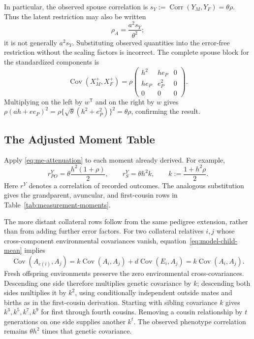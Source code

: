 In particular, the observed spouse correlation is
$s_Y:=\operatorname{Corr}(Y_M,Y_F)=\theta\rho$. Thus the latent
restriction may also be written
\[
 \rho_A=\frac{a^2s_Y}{\theta^2};
\]
it is not generally $a^2s_Y$. Substituting observed quantities into the
error-free restriction without the scaling factors is incorrect.
The complete spouse block for the standardized components is
\[
 \operatorname{Cov}(X_M^+,X_F^+)
 =\rho\begin{pmatrix}
 h^2&he_P&0\\he_P&e_P^2&0\\0&0&0
 \end{pmatrix}.
\]
Multiplying on the left by $w^{\mathsf T}$ and on the right by $w$
gives $\rho(ah+ee_P)^2
=\rho\{\sqrt{\theta}(h^2+e_P^2)\}^2=\theta\rho$, confirming the result.

\subsection{The Adjusted Moment Table}
\label{sec:me-table}

Apply \eqref{eq:me-attenuation} to each moment already derived. For
example,
\[
 r_{PO}^{Y}=\theta\frac{h^2(1+\rho)}{2},\qquad
 r_S^{Y}=\theta h^2k,\qquad
 k:=\frac{1+h^2\rho}{2}.
\]
Here $r^Y$ denotes a correlation of recorded outcomes. The analogous
substitution gives the grandparent, avuncular, and first-cousin rows
in Table~\ref{tab:measurement-moments}.

The more distant collateral rows follow from the same pedigree
extension, rather than from adding further error factors.
For two collateral relatives $i,j$ whose cross-component environmental
covariances vanish, equation~\eqref{eq:model-child-mean} implies
\[
 \operatorname{Cov}(A_{c(i)},A_j)
 =k\operatorname{Cov}(A_i,A_j)+d\operatorname{Cov}(E_i,A_j)
 =k\operatorname{Cov}(A_i,A_j).
\]
Fresh offspring environments preserve the zero environmental
cross-covariances. Descending one side therefore multiplies genetic
covariance by $k$; descending both sides multiplies it by $k^2$,
using conditionally independent outside mates and births as in the
first-cousin derivation. Starting with sibling covariance $k$ gives
$k^3,k^5,k^7,k^9$ for first through fourth cousins. Removing a cousin
relationship by $t$ generations on one side supplies another $k^t$.
The observed phenotype correlation remains $\theta h^2$ times that
genetic covariance.

